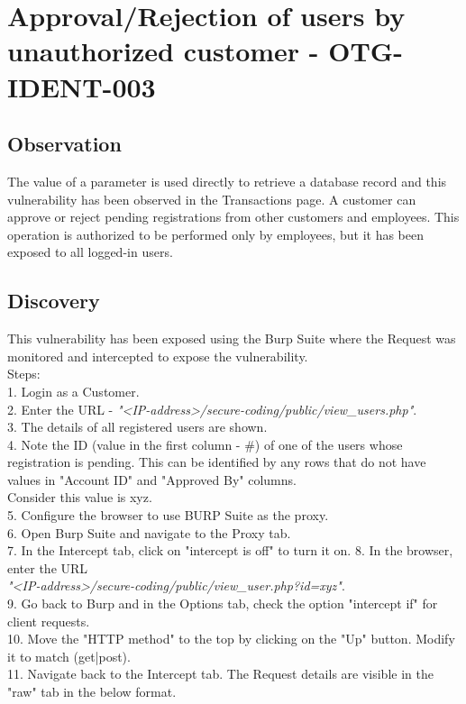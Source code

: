 \section{Approval/Rejection of users by unauthorized customer - OTG-IDENT-003}

\subsection{Observation}
The value of a parameter is used directly to retrieve a database record and this vulnerability has been observed in the Transactions page.
A customer can approve or reject pending registrations from other customers and employees. This operation is authorized to be performed only by employees, but it has been exposed to all logged-in users. 

\subsection{Discovery}
This vulnerability has been exposed using the Burp Suite where the Request was monitored and intercepted to expose the vulnerability.\\
Steps: \\
1. Login as a Customer. \\
2. Enter the URL -  \textit{"<IP-address>/secure-coding/public/view\_users.php"}. \\
3. The details of all registered users are shown. \\
4. Note the ID (value in the first column - \#) of one of the users whose registration is pending. This can be identified by any rows that do not have values in "Account ID" and "Approved By" columns.\\
Consider this value is xyz. \\
5. Configure the browser to use BURP Suite as the proxy. \\
6. Open Burp Suite and navigate to the Proxy tab. \\
7. In the Intercept tab, click on "intercept is off" to turn it on.
8. In the browser, enter the URL \\
\textit{"<IP-address>/secure-coding/public/view\_user.php?id=xyz"}. \\
9. Go back to Burp and in the Options tab, check the option "intercept if" for client requests. \\
10. Move the "HTTP method" to the top by clicking on the "Up" button. Modify it to match (get|post). \\
11. Navigate back to the Intercept tab. The Request details are visible in the "raw" tab in the below format. \\ 
